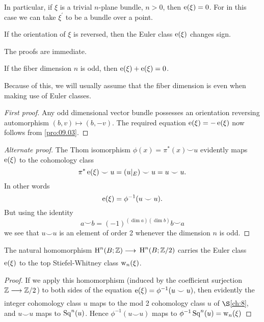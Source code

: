 \documentclass[../main]{subfiles}
\begin{document}
In particular, if $\xi$ is a trivial $n$-plane bundle, $n>0$, then $\operatorname{e}(\xi)=0$. For in this case we can take $\xi^{\prime}$ to be a bundle over a point.

\begin{property}\label{pro:09.03}
If the orientation of $\xi$ is reversed, then the Euler class $\operatorname{e} (\xi)$ changes sign.

\end{property} 
The proofs are immediate.

\begin{property}\label{pro:09.04} If the fiber dimension $n$ is odd, then $\operatorname{e}(\xi)+\operatorname{e}(\xi)=0$.

\end{property}
Because of this, we will usually assume that the fiber dimension is even when making use of Euler classes.
\begin{proof}[First proof] Any odd dimensional vector bundle possesses an orientation reversing automorphism $(b, v) \mapsto(b,-v)$. The required equation $\operatorname{e}(\xi)=-\operatorname{e}(\xi)$ now follows from \ref{pro:09.03}.

\end{proof}

\begin{proof}[Alternate proof] The Thom isomorphism $\phi(x)=\pi^{*}(x) \smile u$ evidently maps $\operatorname{e}(\xi)$ to the cohomology class
\[
\pi^{*} \operatorname{e}(\xi) \smile u=(u |_{E}) \smile u=u \smile u.
\]
In other words
\[
\operatorname{e}(\xi)=\phi^{-1}(u \smile u).
\]
But using the identity
\[
a \smile b=(-1)^{(\dim a)(\dim b)} b \smile a
\]
we see that $u \smile u$ is an element of order 2 whenever the dimension $n$ is odd.

\end{proof}

\begin{property}\label{pro:09.05}
 The natural homomorphism $\homology^{n}(\base ; \mathbb{Z}) \varrightarrow{}$ $\operatorname{H}^{n}(B ; \mathbb{Z} / 2)$ carries the Euler class $\operatorname{e}(\xi)$ to the top Stiefel-Whitney class $\operatorname{w}_{n}(\xi)$.
\end{property}
\begin{proof} If we apply this homomorphism (induced by the coefficient surjection $\mathbb{Z} \varrightarrow{} \mathbb{Z} / 2$) to both sides of the equation $\operatorname{e}(\xi)=\phi^{-1}(u \smile u)$, then evidently the integer cohomology class $u$ maps to the mod 2 cohomology class $u$ of $\S$\ref{ch:8}, and $u \smile u$ maps to $\operatorname{Sq}^{n}(u)$. Hence $\phi^{-1}(u \smile u)$ maps to $\phi^{-1} \operatorname{Sq}^{n}(u)=\operatorname{w}_{n}(\xi)$
\end{proof}
\end{document}
